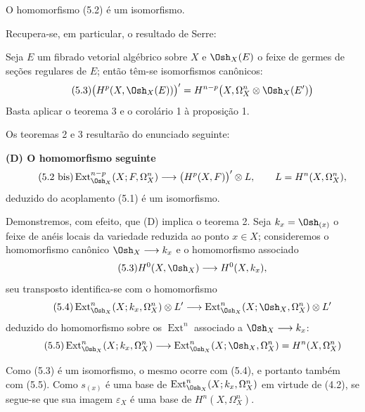  O homomorfismo (5.2) é um isomorfismo.

Recupera-se, em particular, o resultado de Serre:

 Seja $E$ um fibrado vetorial algébrico sobre $X$ e
$\Osh_X(E)$ o feixe de germes de seções regulares de $E$; então têm-se
isomorfismos canônicos:
\begin{equation}\tag{5.3}
  \bigl(H^{p}(X,\Osh_X(E))\bigr)'
  =H^{n-p}\bigl(X,\Omega_X^{n}\otimes\Osh_X(E')\bigr)
\end{equation}
Basta aplicar o teorema 3 e o corolário 1 à proposição 1.

Os teoremas 2 e 3 resultarão do enunciado seguinte:

\noindent\textbf{(D) O homomorfismo seguinte}
\begin{equation}\tag{5.2 bis}
  \operatorname{Ext}_{\Osh_X}^{n-p}(X;F,\Omega_X^{n})
  \longrightarrow\bigl(H^{p}(X,F)\bigr)'\otimes L,
  \qquad L=H^{n}(X,\Omega_X^{n}),
\end{equation}
deduzido do acoplamento (5.1) é um isomorfismo.

Demonstremos, com efeito, que (D) implica o teorema 2. Seja
$k_x=\Osh_{(x)}$ o feixe de anéis locais da variedade reduzida ao ponto
$x\in X$; consideremos o homomorfismo canônico
$\Osh_X\longrightarrow k_x$ e o homomorfismo associado
\begin{equation}\tag{5.3}
  H^{0}(X,\Osh_X)\longrightarrow H^{0}(X,k_x),
\end{equation}
seu transposto identifica-se com o homomorfismo
\begin{equation}\tag{5.4}
  \operatorname{Ext}_{\Osh_X}^{n}(X;k_x,\Omega_X^{n})\otimes L'
  \longrightarrow
  \operatorname{Ext}_{\Osh_X}^{n}(X;\Osh_X,\Omega_X^{n})\otimes L'
\end{equation}
deduzido do homomorfismo sobre os $\operatorname{Ext}^{n}$ associado a
$\Osh_X\longrightarrow k_x$:
\begin{equation}\tag{5.5}
  \operatorname{Ext}_{\Osh_X}^{n}(X;k_x,\Omega_X^{n})
  \longrightarrow
  \operatorname{Ext}_{\Osh_X}^{n}(X;\Osh_X,\Omega_X^{n})
  =H^{n}(X,\Omega_X^{n})
\end{equation}

Como (5.3) é um isomorfismo, o mesmo ocorre
com (5.4), e portanto também com (5.5). Como $s_{(x)}$ é uma base de
$\operatorname{Ext}_{\Osh_X}^{n}(X;k_x,\Omega_X^{n})$ em virtude de (4.2), se
segue-se que sua imagem $\varepsilon_X$ é uma base de
$H^{n}(X,\Omega_X^{n})$.

